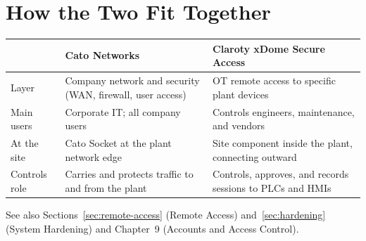 \section{How the Two Fit Together}
\begin{center}
\begin{tabular}{@{}P{3.68cm}P{6.59cm}P{6.66cm}@{}}
\toprule
{} & \textbf{Cato Networks} & \textbf{Claroty xDome Secure Access} \\
\midrule
Layer & Company network and security (WAN, firewall, user access) & OT remote access to specific plant devices \\
Main users & Corporate IT; all company users & Controls engineers, maintenance, and vendors \\
At the site & Cato Socket at the plant network edge & Site component inside the plant, connecting outward \\
Controls role & Carries and protects traffic to and from the plant & Controls, approves, and records sessions to PLCs and HMIs \\
\bottomrule
\end{tabular}
\end{center}
See also Sections~\ref{sec:remote-access} (Remote Access) and~\ref{sec:hardening} (System Hardening) and Chapter~9 (Accounts and Access Control).
